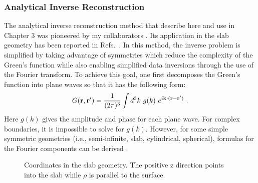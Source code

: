 \subsubsection{Analytical Inverse Reconstruction}
\label{sec:Analytic}
The analytical inverse reconstruction method that describe here and use in Chapter 3 was pioneered by my collaborators \cite{Markel2001,Markel2002,Markel2002a,Markel2003,Markel2003a,Markel2004,Konecky2008a}. Its application in the slab geometry has been reported in Refs.~\cite{Wang2005,Konecky2008a,Ban2013}. In this method, the inverse problem is simplified by taking advantage of symmetries which reduce the complexity of the Green's function while also enabling simplified data inversions through the use of the Fourier transform. To achieve this goal, one first decomposes the Green's function into plane waves so that it has the following form:
\begin{equation}
\label{eqn:Gplanes}                                               
G(\mbf{r},\mbf{r}^{\prime}) = \frac{1}{(2\pi)^3}\int d^3k \ g(k) \ e^{i\mbf{k} \cdot (\mbf{r}-\mbf{r}^{\prime})} \ .
\end{equation}
Here $g(k)$ gives the amplitude and phase for each plane wave. For complex boundaries, it is impossible to solve for $g(k)$. However, for some simple symmetric geometries (i.e., semi-infinite, slab, cylindrical, spherical), formulas for the Fourier components can be derived \cite{Markel2002a}.
\begin{figure}
\label{fig:slabcoord}
\caption[Slab geometry diagram]{Coordinates in the slab geometry. The positive z direction points into the slab while $\rho$ is parallel to the surface.}
\end{figure}

